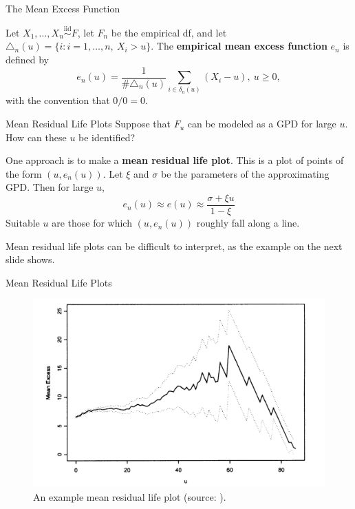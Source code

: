 \documentclass{beamer}
\begin{document}
\begin{frame}{The Mean Excess Function}
    \begin{definition}
        Let $X_1, \ldots, X_n \overset{\text{iid}}{\sim} F$, let $F_n$ be the empirical df, and let $\triangle_n(u) = \{i : i = 1, \ldots, n, \ X_i > u\}$. The \textbf{empirical mean excess function} $e_n$ is defined by
        \[
        e_n(u) = \frac{1}{\#\triangle_n(u)}\sum_{i \in \delta_n(u)} (X_i - u), \ u \ge 0,
        \]
        with the convention that $0 / 0 = 0$.
    \end{definition}
\end{frame}

\begin{frame}{Mean Residual Life Plots}
    Suppose that $F_u$ can be modeled as a GPD for large $u$. How can these $u$ be identified?

    \smallskip

    One approach is to make a \textbf{mean residual life plot}. This is a plot of points of the form $(u, e_n(u))$. Let $\xi$ and $\sigma$ be the parameters of the approximating GPD. Then for large $u$,
    \[
    e_n(u) \approx e(u) \approx \frac{\sigma + \xi u}{1 - \xi}
    \]
    Suitable $u$ are those for which $(u, e_n(u))$ roughly fall along a line.

    \smallskip

    Mean residual life plots can be difficult to interpret, as the example on the next slide shows.
\end{frame}

\begin{frame}{Mean Residual Life Plots}
    \begin{figure}
        \centering
        \includegraphics[scale=0.35]{mean_residual_life_plot.png}
        \caption{An example mean residual life plot (source: \cite{coles_2001}).}
        \label{fig:mean_residual_life_plot}
    \end{figure}
\end{frame}
\end{document}
